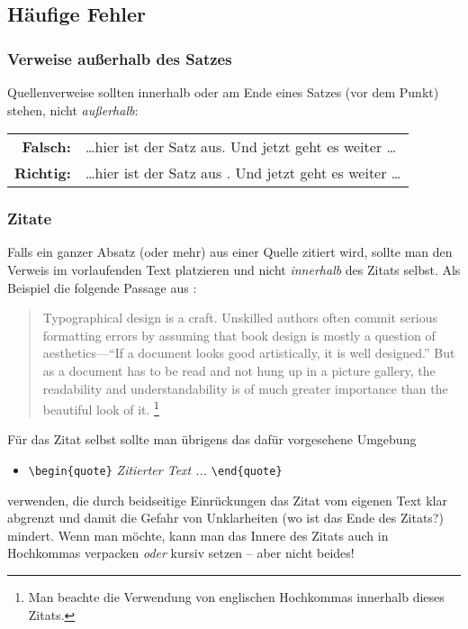 \subsection{Häufige Fehler}

\subsubsection{Verweise außerhalb des Satzes}
Quellenverweise sollten innerhalb oder am Ende eines Satzes (vor
dem Punkt) stehen, nicht \emph{außerhalb}:
%
\begin{center}
\begin{tabular}{rl}
 \textbf{Falsch:}  & \ldots hier ist der Satz aus. \cite{Oetiker01} Und jetzt geht es weiter \ldots \\
 \textbf{Richtig:} & \ldots hier ist der Satz aus \cite{Oetiker01}. Und jetzt geht es weiter \ldots
\end{tabular}
\end{center}

\subsubsection{Zitate}
Falls ein ganzer Absatz (oder mehr) aus einer Quelle zitiert wird,
sollte man den Verweis im vorlaufenden Text platzieren und nicht
\emph{innerhalb} des Zitats selbst. Als Beispiel die folgende Passage
aus \cite{Oetiker01}:
\begin{quote}
Typographical design is a craft. Unskilled authors often commit
serious formatting errors by assuming that book design is mostly a
question of aesthetics---``If a document looks good artistically,
it is well designed.'' But as a document has to be read and not
hung up in a picture gallery, the readability and
understandability is of much greater importance than the beautiful
look of it.%
\footnote{Man beachte die Verwendung von englischen Hochkommas innerhalb dieses
Zitats.}
\end{quote}
Für das Zitat selbst sollte man übrigens das dafür vorgesehene Umgebung
%
\begin{itemize}
 \item[] \verb!\begin{quote}! \emph{Zitierter Text ...} \verb!\end{quote}!
\end{itemize}
%
verwenden, die durch beidseitige Einrückungen das
Zitat vom eigenen Text klar abgrenzt und damit die Gefahr von
Unklarheiten (wo ist das Ende des Zitats?) mindert.
Wenn man möchte, kann man das Innere des Zitats auch in Hochkommas verpacken 
\emph{oder} kursiv setzen -- aber nicht beides!





